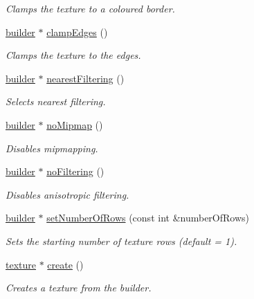 \begin{DoxyCompactItemize}
\begin{DoxyCompactList}\small\item\em Clamps the texture to a coloured border. \end{DoxyCompactList}\item 
\hyperlink{classflounder_1_1texture_1_1builder}{builder} $\ast$ \hyperlink{classflounder_1_1texture_1_1builder_a1d71b958407c1c34689bec6ea0ae5893}{clamp\+Edges} ()
\begin{DoxyCompactList}\small\item\em Clamps the texture to the edges. \end{DoxyCompactList}\item 
\hyperlink{classflounder_1_1texture_1_1builder}{builder} $\ast$ \hyperlink{classflounder_1_1texture_1_1builder_a79f551a20e6327a2f011da83e48236e6}{nearest\+Filtering} ()
\begin{DoxyCompactList}\small\item\em Selects nearest filtering. \end{DoxyCompactList}\item 
\hyperlink{classflounder_1_1texture_1_1builder}{builder} $\ast$ \hyperlink{classflounder_1_1texture_1_1builder_a50118f124ac5bb262a4050d1f1abc18b}{no\+Mipmap} ()
\begin{DoxyCompactList}\small\item\em Disables mipmapping. \end{DoxyCompactList}\item 
\hyperlink{classflounder_1_1texture_1_1builder}{builder} $\ast$ \hyperlink{classflounder_1_1texture_1_1builder_aaf06c461f3292f734deb56b9bd931f1e}{no\+Filtering} ()
\begin{DoxyCompactList}\small\item\em Disables anisotropic filtering. \end{DoxyCompactList}\item 
\hyperlink{classflounder_1_1texture_1_1builder}{builder} $\ast$ \hyperlink{classflounder_1_1texture_1_1builder_ac301872d40557b9b893852578aaffbfd}{set\+Number\+Of\+Rows} (const int \&number\+Of\+Rows)
\begin{DoxyCompactList}\small\item\em Sets the starting number of texture rows (default = 1). \end{DoxyCompactList}\item 
\hyperlink{classflounder_1_1texture}{texture} $\ast$ \hyperlink{classflounder_1_1texture_1_1builder_a6ac034708fc31a0b38c0ba0f0af688f7}{create} ()
\begin{DoxyCompactList}\small\item\em Creates a texture from the builder. \end{DoxyCompactList}\end{DoxyCompactItemize}
